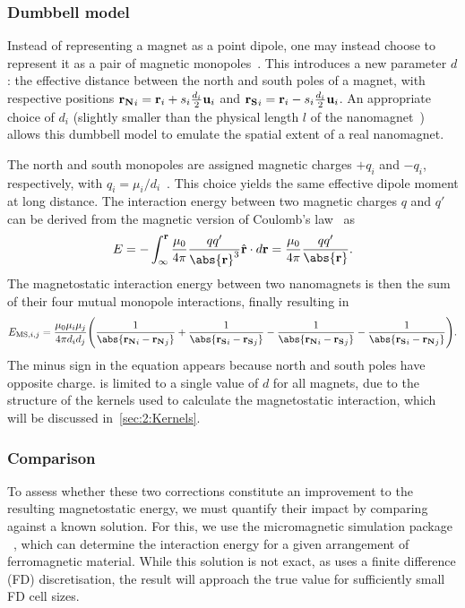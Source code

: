 \subsubsection{Dumbbell model}\label{sec:2:Dumbbell}
Instead of representing a magnet as a point dipole, one may instead choose to represent it as a pair of magnetic monopoles~\cite{MagneticMonopoles2008,MagneticMonopoleDynamics}.
This introduces a new parameter $d$: the effective distance between the north and south poles of a magnet, with respective positions $\boldsymbol{\mathbf{r_N}}_i = \boldsymbol{\mathbf{r}}_i + s_i\frac{d_i}{2}\boldsymbol{\mathbf{u}}_i$ and $\boldsymbol{\mathbf{r_S}}_i = \boldsymbol{\mathbf{r}}_i - s_i\frac{d_i}{2}\boldsymbol{\mathbf{u}}_i$.
An appropriate choice of $d_i$ (slightly smaller than the physical length $l$ of the nanomagnet~\cite{DDG_Masterproef}) allows this dumbbell model to emulate the spatial extent of a real nanomagnet. \par
The north and south monopoles are assigned magnetic charges $+q_i$ and $-q_i$, respectively, with $q_i=\mu_i/d_i$~\cite{MagneticMonopoles2008}.
This choice yields the same effective dipole moment at long distance.
The interaction energy between two magnetic charges $q$ and $q'$ can be derived from the magnetic version of Coulomb's law~\cite{ForceMagneticDipole} as
\begin{equation}
	E = -\int_\infty^{\vc{r}} \frac{\mu_0}{\num{4}\pi}\frac{qq'}{\abs{\vc{r}}^3} \hat{\vc{r}} \cdot d\vc{r} = \frac{\mu_0}{\num{4}\pi} \frac{qq'}{\abs{\vc{r}}} \mathrm{.}
\end{equation}
The magnetostatic interaction energy between two nanomagnets is then the sum of their four mutual monopole interactions, finally resulting in
\begin{equation}
	E_{\mathrm{MS},i,j} = \frac{\mu_0 \mu_i \mu_j}{4\pi d_i d_j} \Bigg(\frac{1}{\abs{\mathbf{r_N}_i - \mathbf{r_N}_j}} + \frac{1}{\abs{\mathbf{r_S}_i - \mathbf{r_S}_j}}\\ - \frac{1}{\abs{\mathbf{r_N}_i - \mathbf{r_S}_j}} - \frac{1}{\abs{\mathbf{r_S}_i - \mathbf{r_N}_j}}\Bigg) \mathrm{.} \label{eq:2:E_MS_mono}
\end{equation}
The minus sign in the equation appears because north and south poles have opposite charge.
\hotspice is limited to a single value of $d$ for all magnets, due to the structure of the kernels used to calculate the magnetostatic interaction, which will be discussed in~\cref{sec:2:Kernels}.

\subsubsection{Comparison}
To assess whether these two corrections constitute an improvement to the resulting magnetostatic energy, we must quantify their impact by comparing against a known solution.
For this, we use the micromagnetic simulation package \mumax~\cite{mumax3}, which can determine the interaction energy for a given arrangement of ferromagnetic material.
While this solution is not exact, as \mumax uses a finite difference (FD) discretisation, the result will approach the true value for sufficiently small FD cell sizes. \\\par

